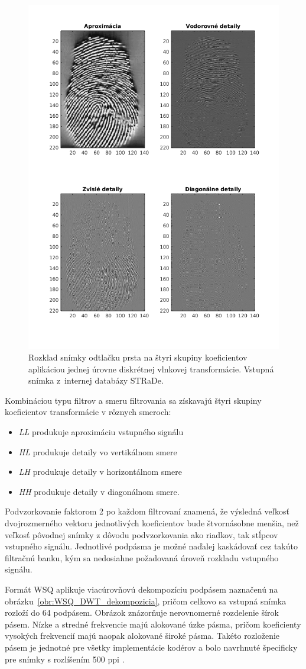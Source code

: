   \begin{figure}[h]
    \centering
    \includegraphics[width=0.5\linewidth]{obrazky-figures/DWT_rozklad_odtlacku.png}
    \caption{Rozklad snímky odtlačku prsta na štyri skupiny koeficientov aplikáciou jednej úrovne diskrétnej vlnkovej transformácie. Vstupná snímka
    z~internej databázy STRaDe.}
    \label{obr:dwt_rozklad_snimky}
  \end{figure}

  Kombináciou typu filtrov a smeru filtrovania sa získavajú štyri skupiny koeficientov transformácie v rôznych smeroch: 
  \begin{itemize}
    \item \emph{LL} produkuje aproximáciu vstupného signálu
    \item \emph{HL} produkuje detaily vo vertikálnom smere
    \item \emph{LH} produkuje detaily v horizontálnom smere
    \item \emph{HH} produkuje detaily v diagonálnom smere.
  \end{itemize}
  Podvzorkovanie faktorom 2 po každom filtrovaní znamená, že výsledná veľkosť dvojrozmerného vektoru jednotlivých koeficientov bude štvornásobne
  menšia, než veľkosť pôvodnej snímky z dôvodu podvzorkovania ako riadkov, tak stĺpcov vstupného signálu.
  Jednotlivé podpásma je možné naďalej kaskádovať cez takúto filtračnú banku, kým sa nedosiahne požadovaná úroveň rozkladu vstupného signálu.

  Formát WSQ aplikuje viacúrovňovú dekompozíciu podpásem naznačenú na obrázku~{\ref{obr:WSQ_DWT_dekompozicia}}, pričom celkovo sa vstupná snímka rozloží
  do 64 podpásem. Obrázok znázorňuje nerovnomerné rozdelenie šírok pásem. Nízke a stredné frekvencie majú alokované úzke pásma, pričom koeficienty vysokých
  frekvencií majú naopak alokované široké pásma. Takéto rozloženie pásem je jednotné pre všetky implementácie kodérov a bolo navrhnuté špecificky pre snímky
  s rozlíšením 500 ppi \cite{brislawn1996compression}.


